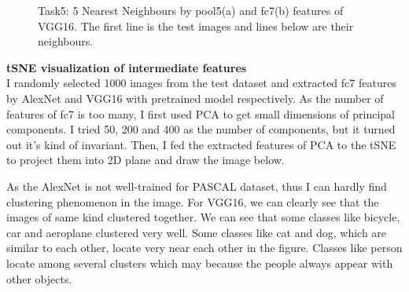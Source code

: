\documentclass[12pt]{report}
\begin{document}
\begin{outline}
\begin{figure}[!h]
  \centering
  \caption{Task5: 5 Nearest Neighbours by pool5(a) and fc7(b) features of VGG16. The first line is the test images and lines below are their neighbours.}
\label{fig:short}
\end{figure}

\textbf{tSNE visualization of intermediate features}\\

I randomly selected 1000 images from the test dataset and extracted fc7 features by AlexNet and VGG16 with pretrained model respectively. As the number of features of fc7 is too many, I first used PCA to get small dimensions of principal components. I tried 50, 200 and 400 as the number of components, but it turned out it's kind of invariant. Then, I fed the extracted features of PCA to the tSNE to project them into 2D plane and draw the image below.

As the AlexNet is not well-trained for PASCAL dataset, thus I can hardly find clustering phenomenon in the image. For VGG16, we can clearly see that the images of same kind clustered together. We can see that some classes like bicycle, car and aeroplane clustered very well. Some classes like cat and dog, which are similar to each other, locate very near each other in the figure. Classes like person locate among several clusters which may because the people always appear with other objects.\\ 


\end{outline}
\end{document}
